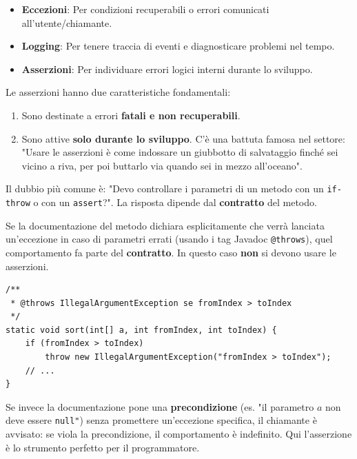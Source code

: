 \begin{itemize}
    \item \textbf{Eccezioni}: Per condizioni recuperabili o errori comunicati all'utente/chiamante.
    \item \textbf{Logging}: Per tenere traccia di eventi e diagnosticare problemi nel tempo.
    \item \textbf{Asserzioni}: Per individuare errori logici interni durante lo sviluppo.
\end{itemize} 

\medskip

Le asserzioni hanno due caratteristiche fondamentali:
\begin{enumerate}
    \item Sono destinate a errori \textbf{fatali e non recuperabili}.
    \item Sono attive \textbf{solo durante lo sviluppo}. C'è una battuta famosa nel settore: "Usare le asserzioni è come indossare un giubbotto di salvataggio finché sei vicino a riva, per poi buttarlo via quando sei in mezzo all'oceano".
\end{enumerate}

\medskip

Il dubbio più comune è: "Devo controllare i parametri di un metodo con un \texttt{if-throw} o con un \texttt{assert}?". La risposta dipende dal \textbf{contratto} del metodo.

Se la documentazione del metodo dichiara esplicitamente che verrà lanciata un'eccezione in caso di parametri errati (usando i tag Javadoc \texttt{@throws}), quel comportamento fa parte del \textbf{contratto}. In questo caso \textbf{non} si devono usare le asserzioni.

\begin{lstlisting}[caption={Esempio di contratto con eccezioni}]
/**
 * @throws IllegalArgumentException se fromIndex > toIndex
 */
static void sort(int[] a, int fromIndex, int toIndex) {
    if (fromIndex > toIndex) 
        throw new IllegalArgumentException("fromIndex > toIndex");
    // ...
}
\end{lstlisting}

Se invece la documentazione pone una \textbf{precondizione} (es. "il parametro $a$ non deve essere \texttt{null"}) senza promettere un'eccezione specifica, il chiamante è avvisato: se viola la precondizione, il comportamento è indefinito. Qui l'asserzione è lo strumento perfetto per il programmatore.


